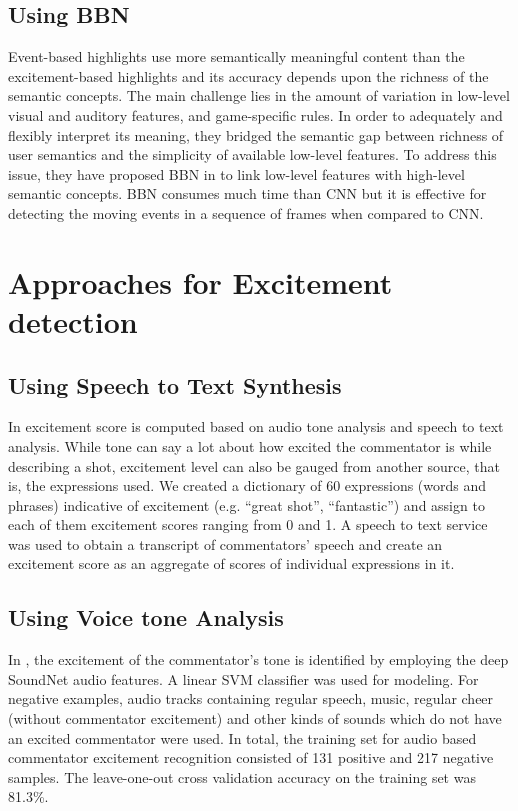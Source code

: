  \subsection{Using BBN}
Event-based highlights use more semantically meaningful content than the excitement-based highlights and its accuracy depends upon the richness of the semantic concepts. The main challenge lies in the
amount of variation in low-level visual and auditory features,
and game-specific rules. In order to adequately and flexibly interpret its meaning, they bridged the semantic gap between richness of user semantics and the simplicity of available low-level features. To address this issue, they have proposed BBN in \cite{7101847} to link low-level features with high-level semantic concepts. BBN consumes much time than CNN but it is effective for detecting the moving events in a sequence of frames when compared to CNN.
\section{Approaches for Excitement detection}
\subsection{Using Speech to Text Synthesis}
In \cite{8491305} excitement score is computed based on audio tone analysis and speech to text analysis.
 While tone can say a lot about how excited the commentator is while describing a shot, excitement level can also be gauged from another source, that is, the expressions used. We created a dictionary of 60 expressions (words and phrases) indicative of excitement (e.g. “great shot”, “fantastic”) and assign to each of them excitement scores ranging from 0 and 1. A speech to text service was used to obtain a transcript of commentators’ speech and create an excitement score as an aggregate of scores of individual expressions in it. 
\subsection{Using Voice tone Analysis}
In \cite{8491305}, the excitement of the commentator's tone is identified by employing the deep SoundNet audio features. A linear SVM classiﬁer was used for modeling. For negative examples, audio tracks containing regular speech, music, regular cheer (without commentator excitement) and other kinds of sounds which do not have an excited commentator were used. In total, the training set for audio based commentator excitement recognition consisted of 131 positive and 217 negative samples. The leave-one-out cross validation accuracy on the training set was 81.3\%.
